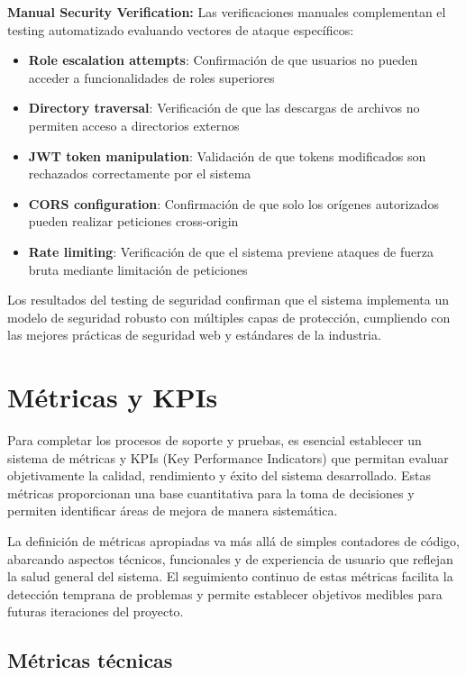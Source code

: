 \documentclass[12pt,a4paper,oneside]{report}
\begin{document}
\textbf{Manual Security Verification:} Las verificaciones manuales complementan el testing automatizado evaluando vectores de ataque específicos:
\begin{itemize}
\item \textbf{Role escalation attempts}: Confirmación de que usuarios no pueden acceder a funcionalidades de roles superiores
\item \textbf{Directory traversal}: Verificación de que las descargas de archivos no permiten acceso a directorios externos
\item \textbf{JWT token manipulation}: Validación de que tokens modificados son rechazados correctamente por el sistema
\item \textbf{CORS configuration}: Confirmación de que solo los orígenes autorizados pueden realizar peticiones cross-origin
\item \textbf{Rate limiting}: Verificación de que el sistema previene ataques de fuerza bruta mediante limitación de peticiones
\end{itemize}

Los resultados del testing de seguridad confirman que el sistema implementa un modelo de seguridad robusto con múltiples capas de protección, cumpliendo con las mejores prácticas de seguridad web y estándares de la industria.

\section{Métricas y KPIs}\label{muxe9tricas-y-kpis}

Para completar los procesos de soporte y pruebas, es esencial establecer
un sistema de métricas y KPIs (Key Performance Indicators) que permitan
evaluar objetivamente la calidad, rendimiento y éxito del sistema
desarrollado. Estas métricas proporcionan una base cuantitativa para la
toma de decisiones y permiten identificar áreas de mejora de manera
sistemática.

La definición de métricas apropiadas va más allá de simples contadores
de código, abarcando aspectos técnicos, funcionales y de experiencia de
usuario que reflejan la salud general del sistema. El seguimiento
continuo de estas métricas facilita la detección temprana de problemas y
permite establecer objetivos medibles para futuras iteraciones del
proyecto.

\subsection{Métricas técnicas}\label{muxe9tricas-tuxe9cnicas}
\end{document}
